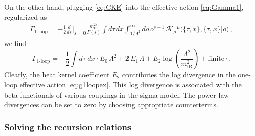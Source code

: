 \documentclass[11pt]{article}
\newcommand{\be}{\begin{equation}}
\newcommand{\ee}{\end{equation}}
\newcommand{\CK}{\mathcal{K}}
\newcommand{\lr}{\left (}
\newcommand{\rr}{\right )}
\begin{document}
On the other hand, plugging \eqref{eq:CKE} into the effective action \eqref{eq:Gamma1}, regularized as
%
\begin{align}
	\Gamma_\text{1-loop} = - \frac{1}{2} \frac{d}{ds} \bigg|_{s=0} \frac{m_\text{IR}^{2s}}{\Gamma(s)} \int d\tau \, dx \int_{1/\Lambda^2}^\infty do \, o^{s-1} \, \CK_\mu{}^\mu \bigl(\{\tau, x\}, \{\tau, x\} \big| o\bigr)\,,
\end{align}
%
we find
%
\be \label{eq:g1loopex}
	\Gamma_\text{1-loop} = - \frac{1}{2} \int d\tau \, d x \, \biggl\{ E_0 \, \Lambda^2 +  2 \, E_1 \, \Lambda + E_2 \log \! \lr \frac{\Lambda^2}{m_\text{IR}^2} \rr + \text{finite} \biggr\}\,.
\ee
%
Clearly, the heat kernel coefficient $E_2$ contributes the log divergence in the one-loop effective action \eqref{eq:g1loopex}. This log divergence is associated with the beta-functionals of various couplings in the sigma model. The power-law divergences can be set to zero by choosing appropriate counterterms. 

\subsubsection{Solving the recursion relations}
\end{document}

